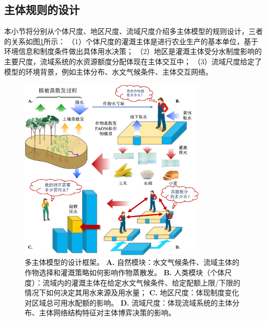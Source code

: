 
\subsection{主体规则的设计}

本小节将分别从个体尺度、地区尺度、流域尺度介绍多主体模型的规则设计，三者的关系如图\ref{ch6:fig:framework}所示：
（1）个体尺度的灌溉主体是进行农业生产的基本单位，基于环境信息和制度条件做出具体用水决策；
（2）地区是灌溉主体受分水制度影响的主要尺度，流域系统的水资源额度分配体现在主体交互中；
（3）流域尺度给定了模型的环境背景，例如主体分布、水文气候条件、主体交互网络。

\begin{figure}[htb]
    \centering
    \includegraphics[width=0.8\textwidth]{img/ch6/ch6_framework.png}
    \caption[多主体模型的设计框架]{多主体模型的设计框架。
        \textbf{A.} 自然模块：水文气候条件、流域主体的作物选择和灌溉策略如何影响作物蒸散发。
        \textbf{B.} 人类模块（个体尺度）：流域内的灌溉主体在给定水文气候条件、给定配额上限/下限的情况下如何决定其用水来源及用水量；
        \textbf{C.} 地区尺度：体现制度变化对区域总可用水配额的影响。
        \textbf{D.} 流域尺度：体现流域系统的主体分布、主体网络结构特征对主体博弈决策的影响。
    }\label{ch6:fig:framework}
\end{figure}

